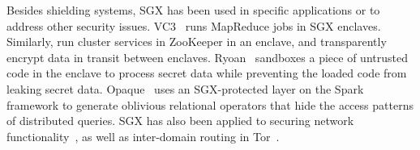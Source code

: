 Besides shielding systems,
SGX has been used in specific applications or to address other security issues.
VC3~\cite{vc3} runs MapReduce jobs in SGX enclaves.
Similarly, \citet{zookeeper}
run cluster services in ZooKeeper in an enclave, and transparently encrypt data in transit between enclaves.
Ryoan~\cite{hunt16ryoan} sandboxes a piece of untrusted code in the enclave
to process secret data while preventing the loaded code from leaking secret data.
Opaque~\cite{zheng2017opaque} uses an SGX-protected layer on the Spark framework to generate oblivious relational operators that hide the access patterns of distributed queries.
SGX has also been applied to securing network functionality~\cite{shih2016s},
as well as inter-domain routing in Tor~\cite{kim2015first}.


